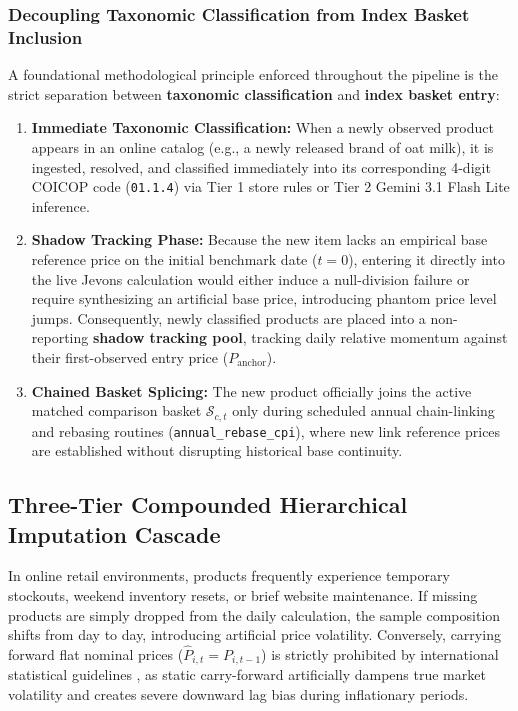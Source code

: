 \subsubsection{Decoupling Taxonomic Classification from Index Basket Inclusion}
\hs A foundational methodological principle enforced throughout the pipeline is the strict separation between \textbf{taxonomic classification} and \textbf{index basket entry}:
\begin{enumerate}
    \item \textbf{Immediate Taxonomic Classification:} When a newly observed product appears in an online catalog (e.g., a newly released brand of oat milk), it is ingested, resolved, and classified immediately into its corresponding 4-digit COICOP code (\texttt{01.1.4}) via Tier 1 store rules or Tier 2 Gemini 3.1 Flash Lite inference.
    \item \textbf{Shadow Tracking Phase:} Because the new item lacks an empirical base reference price on the initial benchmark date ($t=0$), entering it directly into the live Jevons calculation would either induce a null-division failure or require synthesizing an artificial base price, introducing phantom price level jumps. Consequently, newly classified products are placed into a non-reporting \textbf{shadow tracking pool}, tracking daily relative momentum against their first-observed entry price ($P_{\text{anchor}}$).
    \item \textbf{Chained Basket Splicing:} The new product officially joins the active matched comparison basket $\mathcal{S}_{c, t}$ only during scheduled annual chain-linking and rebasing routines (\texttt{annual\_rebase\_cpi}), where new link reference prices are established without disrupting historical base continuity.
\end{enumerate}

\subsection{Three-Tier Compounded Hierarchical Imputation Cascade}\label{sec:imputation}
\hs In online retail environments, products frequently experience temporary stockouts, weekend inventory resets, or brief website maintenance. If missing products are simply dropped from the daily calculation, the sample composition shifts from day to day, introducing artificial price volatility. Conversely, carrying forward flat nominal prices ($\widehat{P}_{i, t} = P_{i, t-1}$) is strictly prohibited by international statistical guidelines \citep{imf2020cpi}, as static carry-forward artificially dampens true market volatility and creates severe downward lag bias during inflationary periods.

